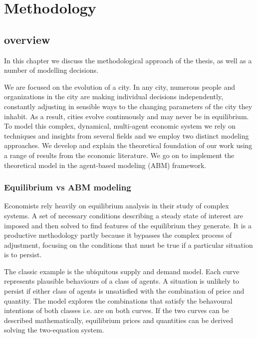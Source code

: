 \chapter{Methodology} \label{chapter-methodology}
\section{overview}
In this chapter we discuss the methodological approach of the thesis, as well as a number of modelling decisions. 


We are focused on the evolution of a city. In any city, numerous people and organizations in the city are making individual decisions independently, constantly adjusting in sensible ways to the changing parameters of the city they inhabit. As a result, cities evolve continuously and may never be in equilibrium.  To model this complex, dynamical, multi-agent economic system we  rely on techniques and insights from several fields and we  employ two distinct modeling approaches. We develop and explain the theoretical foundation of our work using a range of results from the economic  literature. We go on to implement the theoretical model in the agent-based modeling (ABM) framework. 

\subsection{Equilibrium vs ABM modeling}

Economists rely heavily on equilibrium analysis in their study of complex systems. 
A set of necessary conditions describing a steady state of interest are imposed and then solved to find features of the equilibrium they generate. It is a productive methodology partly because it  bypasses the complex process of adjustment, focusing on the conditions that must be true if a particular situation is to persist.

The classic example is the ubiquitous supply and demand model. Each curve represents plausible behaviours of a class of agents. A situation is unlikely to persist if either class of agents is unsatisfied with the combination of price and quantity. The model explores the combinations that satisfy the behavoural intentions of both classes i.e. are on both curves. If the two curves can be described mathematically, equilibrium prices and quantities can be derived solving the two-equation system.

